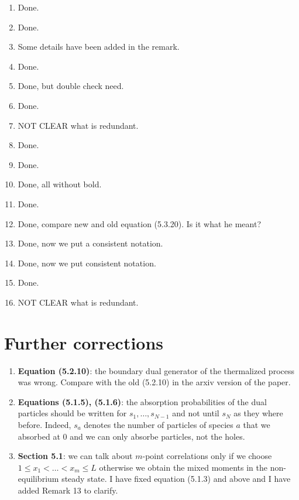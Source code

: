 \documentclass[10pt]{article}
\numberwithin{equation}{section}
\numberwithin{equation}{subsection}
\begin{document}
\begin{enumerate}
			\item Done.
			\item Done.
			\item Some details have been added in the remark.
			\item Done.
			\item Done, but double check need.
			\item Done.
			\item NOT CLEAR what is redundant.
			\item Done.
			\item Done.
			\item Done, all without bold.
			\item Done.
			\item Done, compare new and old equation (5.3.20). Is it what he meant?
			\item Done, now we put a consistent notation.
			\item Done, now we put consistent notation.
			\item Done.
			\item NOT CLEAR what is redundant.
		\end{enumerate}
\section*{Further corrections}
\begin{enumerate}
\item \textbf{Equation (5.2.10)}: the boundary dual generator of the thermalized process was wrong. Compare with the old (5.2.10) in the arxiv version of the paper. 
\item \textbf{Equations (5.1.5), (5.1.6)}: the absorption probabilities of the dual particles should be written for $s_{1},\ldots,s_{N-1}$ and not until $s_{N}$ as they where before. Indeed, $s_{a}$ denotes the number of particles of species $a$ that we absorbed at $0$ and we can only absorbe particles, not the holes. 
\item \textbf{Section 5.1}: we can talk about $m$-point correlations only if we choose $1\leq x_{1}<\ldots<x_{m}\leq L$ otherwise  we obtain the mixed moments in the non-equilibrium steady state. I have fixed equation (5.1.3) and above and I have added Remark 13 to clarify.
\end{enumerate}
	
\end{document}
